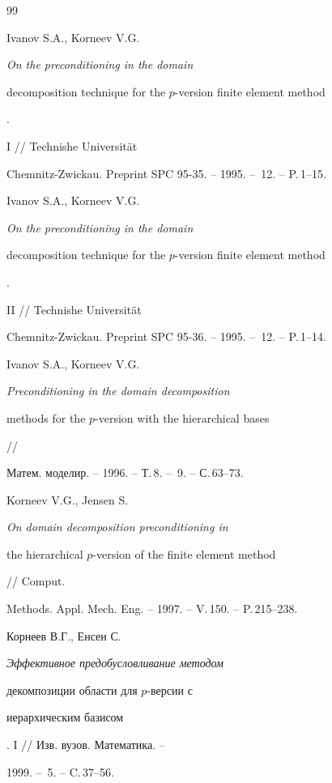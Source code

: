 \begin{thebibliography}{99}


Ivanov S.A., Korneev V.G. {\it On the preconditioning in the domain 


decomposition technique for the $p$-version finite element method}.


I // Technishe Universit\"{a}t


Chemnitz-Zwickau. Preprint SPC 95-35. -- 1995. -- \No\,12. -- P.\,1--15.







Ivanov S.A., Korneev V.G. {\it On the preconditioning in the domain 


decomposition technique for the $p$-version finite element method}.


II // Technishe Universit\"{a}t


Chemnitz-Zwickau. Preprint SPC 95-36. -- 1995. -- \No\,12. -- P.\,1--14.







Ivanov S.A., Korneev V.G. {\it Preconditioning in the domain decomposition


methods for the $p$-version with the hierarchical bases} //


Матем. моделир. -- 1996. -- Т.\,8. -- \No\,9. -- С.\,63--73.







Korneev V.G., Jensen S. {\it On domain decomposition preconditioning in 


the hierarchical $p$-version of the finite element method} // Comput. 


Methods. Appl. Mech. Eng. -- 1997. -- V.\,150. -- P.\,215--238.







Корнеев В.Г., Енсен С. {\it Эффективное предобусловливание методом 


декомпозиции области для $p$-версии с


иерархическим базисом}. I // Изв. вузов. Математика. --


1999. -- \No\,5. -- C.\,37--56.








\end{thebibliography}
